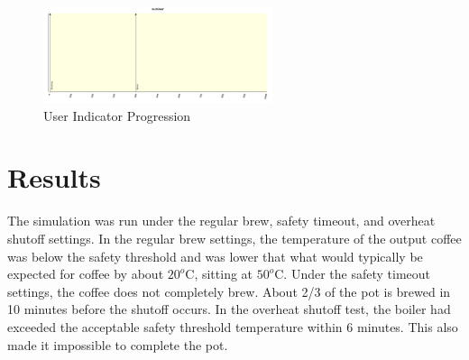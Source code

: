 \documentclass[10pt]{article}
\begin{document}
\begin{center}
  \begin{figure}[H]
    \begin{center}
      \includegraphics[width=0.6\textwidth]{input/test-3-plot}
      \caption{User Indicator Progression}
      \label{ref:test-3-plot}
    \end{center}
  \end{figure}
\end{center}


\section{Results}
The simulation was run under the regular brew, safety timeout, and overheat shutoff settings. In
the regular brew settings, the temperature of the output coffee was below the safety threshold and was
lower that what would typically be expected for coffee by about $20^o$C, sitting at $50^o$C. Under the safety
timeout settings, the coffee does not completely brew. About 2/3 of the pot is brewed in 10
minutes before the shutoff occurs. In the overheat shutoff test, the boiler had exceeded the
acceptable safety threshold temperature within 6 minutes. This also made it impossible to complete the
pot.
\end{document}
